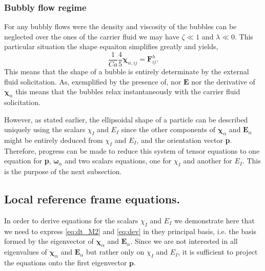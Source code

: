 \subsubsection{Bubbly flow regime}
For any bubbly flows were the density and viscosity of the bubbles can be neglected over the ones of the carrier fluid we may have $\zeta \ll 1$ and $\lambda \ll 0$. 
This particular situation the shape equaiton simplifies greatly and yields, 
\begin{equation}
    \frac{1}{Ca}
    \frac{4  }{5} \bm\chi_{\alpha,ij}
    = \textbf{F}_{ij}^h. 
    \label{eq:bubbles}
\end{equation}
This means that the shape of a bubble is entirely determinate by the external fluid solicitation. 
As, exemplified by the presence of, nor $\textbf{E}$ nor the derivative of $\bm\chi_\alpha$ this means that the bubbles relax instantaneously with the carrier fluid solicitation. 



However, as stated earlier, the ellipsoidal shape of a particle can be described uniquely using the scalars $\chi_I$ and $E_I$ since the other components of $\bm\chi_\alpha$ and $\textbf{E}_\alpha$ might be entirely deduced from $\chi_I$ and $E_I$, and the orientation vector \textbf{p}. 
Therefore, progress can be made to reduce this system of tensor equations to one equation for \textbf{p}, $\bm\omega_\alpha$ and two scalars equations, one for $\chi_I$ and another for $E_I$. 
This is the purpose of the next subsection. 


\subsection{Local reference frame equations.}

In order to derive equations for the scalars $\chi_I$ and $E_I$ we demonstrate here that we need to express \ref{eq:dt_M2} and \ref{eq:dev} in they principal basis, i.e. the basis formed by the eigenvector of $\bm\chi_\alpha$ and $\textbf{E}_\alpha$. 
Since we are not interested in all eigenvalues of $\bm\chi_\alpha$ and $\textbf{E}_\alpha$ but rather only on $\chi_I$ and $E_I$, it is sufficient to project the equations onto the first eigenvector $\textbf{p}$. 

